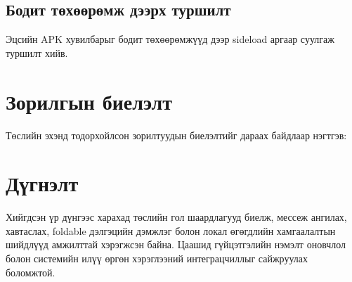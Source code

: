 \subsection{Бодит төхөөрөмж дээрх туршилт}
Эцсийн APK хувилбарыг бодит төхөөрөмжүүд дээр sideload аргаар суулгаж туршилт хийв.

\begin{table}[H]
    \centering
    \caption{Бодит төхөөрөмж дээрх туршилтын үр дүн}
    \label{table:device_test}
\end{table}

\section{Зорилгын биелэлт}
Төслийн эхэнд тодорхойлсон зорилтуудын биелэлтийг дараах байдлаар нэгтгэв:
\begin{table}[H]
    \centering
    \caption{Зорилгын биелэлтийн нэгтгэл}
    \label{table:goal_summary}
\end{table}

\section{Дүгнэлт}
Хийгдсэн үр дүнгээс харахад төслийн гол шаардлагууд биелж, мессеж ангилах, хавтаслах, foldable дэлгэцийн дэмжлэг болон локал өгөгдлийн хамгаалалтын шийдлүүд амжилттай хэрэгжсэн байна. Цаашид гүйцэтгэлийн нэмэлт оновчлол болон системийн илүү өргөн хэрэглээний интеграцчиллыг сайжруулах боломжтой.

